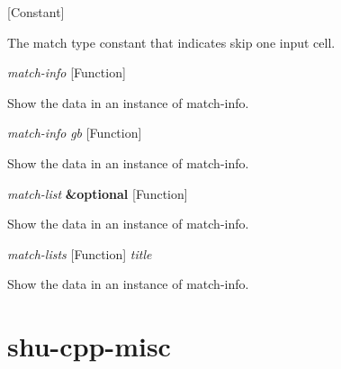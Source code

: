 \vspace{1em}
\noindent
{}
\usebox{\funcname}
 \hfill [Constant]

\begin{doc-string}
The match type constant that indicates skip one input cell.
\end{doc-string}

\vspace{1em}
\noindent
{}
\usebox{\funcname}\emph{match-info}
 \hfill [Function]

\begin{doc-string}
Show the data in an instance of match-info.
\end{doc-string}

\vspace{1em}
\noindent
{}
\usebox{\funcname}\emph{match-info} \emph{gb}
 \hfill [Function]

\begin{doc-string}
Show the data in an instance of match-info.
\end{doc-string}

\vspace{1em}
\noindent
{}
\usebox{\funcname}\emph{match-list} \textbf{\&optional}
 \hfill [Function]
\hspace*{\wd\funcname}

\begin{doc-string}
Show the data in an instance of match-info.
\end{doc-string}

\vspace{1em}
\noindent
{}
\usebox{\funcname}\emph{match-lists}
 \hfill [Function]
\hspace*{\wd\funcname}\emph{title}

\begin{doc-string}
Show the data in an instance of match-info.
\end{doc-string}

\eject
\section{shu-cpp-misc}


